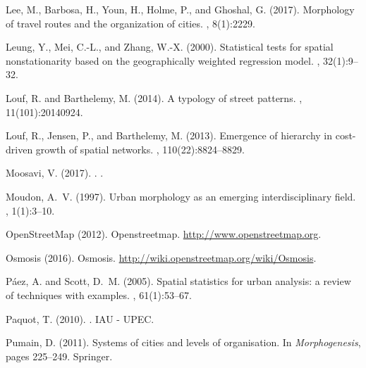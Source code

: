 \documentclass[11pt]{article}
\begin{document}
\begin{thebibliography}{}
Lee, M., Barbosa, H., Youn, H., Holme, P., and Ghoshal, G. (2017).
\newblock Morphology of travel routes and the organization of cities.
, 8(1):2229.

Leung, Y., Mei, C.-L., and Zhang, W.-X. (2000).
\newblock Statistical tests for spatial nonstationarity based on the
  geographically weighted regression model.
, 32(1):9--32.

Louf, R. and Barthelemy, M. (2014).
\newblock A typology of street patterns.
, 11(101):20140924.

Louf, R., Jensen, P., and Barthelemy, M. (2013).
\newblock Emergence of hierarchy in cost-driven growth of spatial networks.
,
  110(22):8824--8829.

{Moosavi}, V. (2017).
.
.

Moudon, A.~V. (1997).
\newblock Urban morphology as an emerging interdisciplinary field.
, 1(1):3--10.

OpenStreetMap (2012).
\newblock Openstreetmap.
\newblock \url{http://www.openstreetmap.org}.

Osmosis (2016).
\newblock Osmosis.
\newblock \url{http://wiki.openstreetmap.org/wiki/Osmosis}.

P{\'a}ez, A. and Scott, D.~M. (2005).
\newblock Spatial statistics for urban analysis: a review of techniques with
  examples.
, 61(1):53--67.

Paquot, T. (2010).
.
\newblock IAU - UPEC.

Pumain, D. (2011).
\newblock Systems of cities and levels of organisation.
\newblock In {\em Morphogenesis}, pages 225--249. Springer.


\end{thebibliography}
\end{document}
